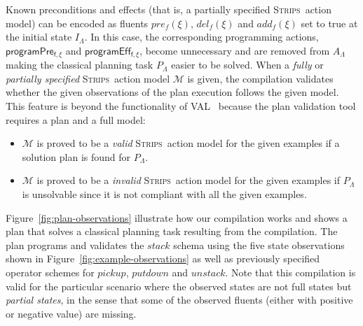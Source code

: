 \documentclass[3p,times]{elsarticle}
\newcommand{\strips}{\textsc{Strips}}     %
\begin{document}
Known preconditions and effects (that is, a partially specified \strips\ action model) can be encoded as fluents $pre_f(\xi)$, $del_f(\xi)$ and $add_f(\xi)$ set to true at the initial state $I_{\Lambda}$. In this case, the corresponding programming actions, $\mathsf{programPre_{f,\xi}}$ and $\mathsf{programEff_{f,\xi}}$, become unnecessary and are removed from $A_{\Lambda}$ making the classical planning task $P_{\Lambda}$ easier to be solved. When a {\em fully} or {\em partially specified} \strips\ action model $\mathcal{M}$ is given, the compilation validates whether the given observations of the plan execution follows the given model. This feature is beyond the functionality of VAL~\cite{howey2004val} because the plan validation tool requires a plan and a full model:
\begin{itemize}
\item $\mathcal{M}$ is proved to be a {\em valid} \strips\ action model for the given examples if a solution plan is found for $P_{\Lambda}$.
\item $\mathcal{M}$ is proved to be a {\em invalid} \strips\ action model for the given examples if $P_{\Lambda}$ is unsolvable since it is not compliant with all the given examples. 
\end{itemize}
  
Figure~\ref{fig:plan-observations} illustrate how our compilation works and shows a plan that solves a classical planning task resulting from the compilation. The plan programs and validates the $stack$ schema using the five state observations shown in Figure~\ref{fig:example-observations} as well as previously specified operator schemes for $pickup$, $putdown$ and $unstack$. Note that this compilation is valid for the particular scenario where the observed states are not full states but {\em partial states}, in the sense that some of the observed fluents (either with positive or negative value) are missing.
\end{document}
